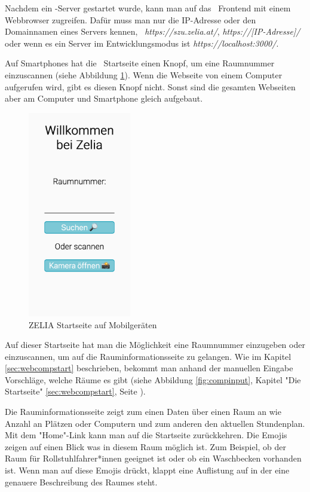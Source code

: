 Nachdem ein \ZELIA-Server gestartet wurde, kann man auf das \ZELIA\ Frontend mit einem Webbrowser zugreifen. Dafür muss man nur die IP-Adresse oder den Domainnamen eines Servers kennen, \zb\ \emph{https://szu.zelia.at/}, \emph{https://[IP-Adresse]/} oder wenn es ein Server im Entwicklungsmodus ist \emph{https://localhost:3000/}.

Auf Smartphones hat die \ZELIA\ Startseite einen Knopf, um eine Raumnummer einzuscannen (siehe Abbildung \ref{fig:zeliastart}). Wenn die Webseite von einem Computer aufgerufen wird, gibt es diesen Knopf nicht. Sonst sind die gesamten Webseiten aber am Computer und Smartphone gleich aufgebaut.

\begin{figure}[H]
    \centering
    \includegraphics[height=90mm]{media/Handbuch/zelia_start.png}
    \caption{ZELIA Startseite auf Mobilgeräten}
    \label{fig:zeliastart}
\end{figure}

Auf dieser Startseite hat man die Möglichkeit eine Raumnummer einzugeben oder einzuscannen, um auf die Rauminformationsseite zu gelangen. Wie im Kapitel \ref{sec:webcompstart} beschrieben, bekommt man anhand der manuellen Eingabe Vorschläge, welche Räume es gibt (siehe Abbildung \ref{fig:compinput}, Kapitel "Die Startseite" \ref{sec:webcompstart}, Seite \pageref{sec:webcompstart}). 

Die Rauminformationsseite zeigt zum einen Daten über einen Raum an wie Anzahl an Plätzen oder Computern und zum anderen den aktuellen Stundenplan. Mit dem "Home"-Link kann man auf die Startseite zurückkehren. Die Emojis zeigen auf einen Blick was in diesem Raum möglich ist. Zum Beispiel, ob der Raum für Rollstuhlfahrer*innen geeignet ist oder ob ein Waschbecken vorhanden ist. Wenn man auf diese Emojis drückt, klappt eine Auflistung auf in der eine genauere Beschreibung des Raumes steht.

